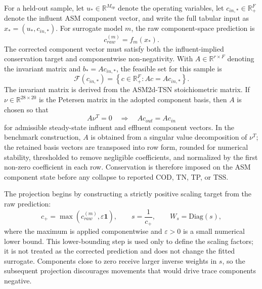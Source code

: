 \documentclass[a4paper,fleqn]{cas-sc}
\begin{document}
For a held-out sample, let $u_* \in \mathbb{R}^{M_{op}}$ denote the operating variables, let $c_{in,*} \in \mathbb{R}_+^F$ denote the influent ASM component vector, and write the full tabular input as $x_*=(u_*,c_{in,*})$. For surrogate model $m$, the raw component-space prediction is
\begin{equation}
\label{eq:raw_component_prediction}
c_{raw}^{(m)} = f_m(x_*).
\end{equation}
The corrected component vector must satisfy both the influent-implied conservation target and componentwise non-negativity. With $A \in \mathbb{R}^{r \times F}$ denoting the invariant matrix and $b_* = A c_{in,*}$, the feasible set for this sample is
\begin{equation}
\label{eq:feasible_set}
\mathcal{F}(c_{in,*}) =
\left\{c \in \mathbb{R}_{+}^{F}: Ac = A c_{in,*}\right\}.
\end{equation}
The invariant matrix is derived from the ASM2d-TSN stoichiometric matrix. If $\nu \in \mathbb{R}^{28 \times 20}$ is the Petersen matrix in the adopted component basis, then $A$ is chosen so that
\begin{equation}
\label{eq:invariant_operator}
A\nu^T=0 \quad \Rightarrow \quad A c_{out}=A c_{in}
\end{equation}
for admissible steady-state influent and effluent component vectors. In the benchmark construction, $A$ is obtained from a singular value decomposition of $\nu^T$; the retained basis vectors are transposed into row form, rounded for numerical stability, thresholded to remove negligible coefficients, and normalized by the first non-zero coefficient in each row. Conservation is therefore imposed on the ASM component state before any collapse to reported COD, TN, TP, or TSS.

The projection begins by constructing a strictly positive scaling target from the raw prediction:
\begin{equation}
\label{eq:positive_scaling}
c_+ = \max\left(c_{raw}^{(m)},\varepsilon\mathbf{1}\right), \qquad
s = \frac{1}{c_+}, \qquad
W_s=\mathrm{Diag}(s),
\end{equation}
where the maximum is applied componentwise and $\varepsilon>0$ is a small numerical lower bound. This lower-bounding step is used only to define the scaling factors; it is not treated as the corrected prediction and does not change the fitted surrogate. Components close to zero receive larger inverse weights in $s$, so the subsequent projection discourages movements that would drive trace components negative.
\end{document}
